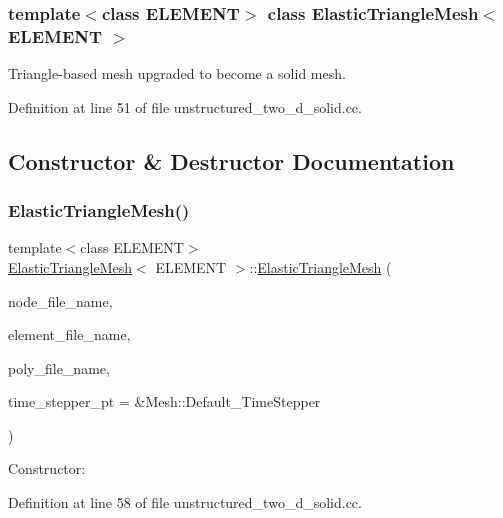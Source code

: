\subsubsection*{template$<$class E\+L\+E\+M\+E\+NT$>$\newline
class Elastic\+Triangle\+Mesh$<$ E\+L\+E\+M\+E\+N\+T $>$}

Triangle-\/based mesh upgraded to become a solid mesh. 

Definition at line 51 of file unstructured\+\_\+two\+\_\+d\+\_\+solid.\+cc.



\subsection{Constructor \& Destructor Documentation}
\mbox{\label{classElasticTriangleMesh_a4c24e9abbde344d34e1e08fb3319d7b6}} 
\subsubsection{\texorpdfstring{Elastic\+Triangle\+Mesh()}{ElasticTriangleMesh()}}
{\footnotesize\ttfamily template$<$class E\+L\+E\+M\+E\+NT$>$ \\
\hyperlink{classElasticTriangleMesh}{Elastic\+Triangle\+Mesh}$<$ E\+L\+E\+M\+E\+NT $>$\+::\hyperlink{classElasticTriangleMesh}{Elastic\+Triangle\+Mesh} (\begin{DoxyParamCaption}\item[{const std\+::string \&}]{node\+\_\+file\+\_\+name,  }\item[{const std\+::string \&}]{element\+\_\+file\+\_\+name,  }\item[{const std\+::string \&}]{poly\+\_\+file\+\_\+name,  }\item[{Time\+Stepper $\ast$}]{time\+\_\+stepper\+\_\+pt = {\ttfamily \&Mesh\+:\+:Default\+\_\+TimeStepper} }\end{DoxyParamCaption})\hspace{0.3cm}{\ttfamily [inline]}}



Constructor\+: 



Definition at line 58 of file unstructured\+\_\+two\+\_\+d\+\_\+solid.\+cc.

